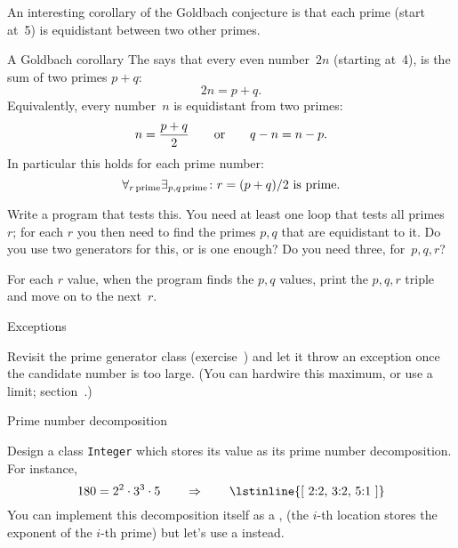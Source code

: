 An interesting corollary of the Goldbach conjecture is that
each prime (start at~5) is equidistant between two other primes.

\begin{block}{A Goldbach corollary}
  \label{sl:goldbach-pqr}
  The  says that every even number~$2n$
  (starting at~4), is the sum of two primes $p+q$: \[ 2n=p+q.\]
  Equivalently, every number~$n$ is equidistant from two primes:
  \[ n=\frac{p+q}2\qquad\hbox{or}\qquad q-n = n-p.\]
  In particular this holds for each prime number:
  \[ \forall_{r\,\mathrm{prime}}\exists_{p,q\,\mathrm{prime}}\colon
  \hbox{$r=(p+q)/2$ is prime}. \]
\end{block}

\begin{exercise}
  \label{ex:prime:goldbach-pqr}

  Write a program that tests this. You need at least one loop that
  tests all primes~$r$; for each $r$ you then need to find the primes
  $p,q$ that are equidistant to it. Do you use two generators for
  this, or is one enough? Do you need three, for~$p,q,r$?

  For each $r$ value, 
  when the program finds the $p,q$ values, print the $p,q,r$ triple and
  move on to the next~$r$.
\end{exercise}

 {Exceptions}


\begin{exercise}
  \label{ex:primegenbreak}
  Revisit the prime generator class (exercise~)
  and let it throw an exception once the candidate number is too large.
  (You can hardwire this maximum, or use a limit; section~.)

\end{exercise}

 {Prime number decomposition}
\label{sec:prime-decomp}


Design a class \lstinline{Integer} which stores its value
as its prime number decomposition. For instance,
\[ 180=2^2\cdot 3^3\cdot 5 \qquad \Rightarrow \qquad \hbox{\lstinline{[ 2:2, 3:2, 5:1 ]}} \]
You can implement this decomposition itself as a ,
(the $i$-th location stores the exponent of the $i$-th prime)
but let's use a  instead.

